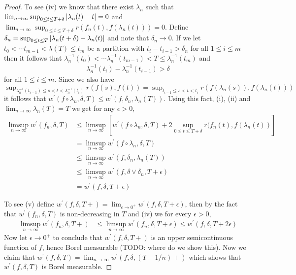 \begin{proof}
To see (iv) we know that there exist $\lambda_n$ such that $\lim_{n \to \infty} \sup_{0 \leq t \leq T+\delta}\left \vert \lambda_n(t) - t \right \vert = 0$ and $\lim_{n \to \infty} \sup_{0 \leq t \leq T+\delta} r(f_n(t), f(\lambda_n(t))) = 0$.  Define $\delta_n = \sup_{0 \leq t \leq T}\left \vert \lambda_n(t+\delta) - \lambda_n(t) \right \vert$ and note that $\delta_n \to 0$.  If we let $t_0 < \dotsb t_{m-1} < \lambda(T) \leq t_m$ be a partition with $t_i - t_{i-1} > \delta_n$ for all $1 \leq i \leq m$ then it follows that $\lambda_n^{-1}(t_0) < \dotsb \lambda_n^{-1}(t_{m-1}) < T \leq \lambda_n^{-1}(t_m)$ and
\begin{align*}
\lambda^{-1}_n(t_i) - \lambda^{-1}_n(t_{i-1}) > \delta
\end{align*}
for all $1 \leq i \leq m$.  Since we also have $\sup_{\lambda^{-1}_n(t_{i-1})  \leq s < t < \lambda^{-1}_n(t_i) } r(f(s), f(t)) = \sup_{t_{i-1}  \leq s < t < t_i} r(f(\lambda_n(s)), f(\lambda_n(t)))$ it follows that $w^\prime(f \circ \lambda_n,\delta, T) \leq w^\prime(f,\delta_n, \lambda_n(T))$.  Using this fact, (i), (ii)  and $\lim_{n \to \infty} \lambda_n(T) = T$ we get for any $\epsilon > 0$,
\begin{align*}
\limsup_{n \to \infty}  w^\prime(f_n,\delta, T) 
&\leq \limsup_{n \to \infty} \left[ w^\prime(f \circ \lambda_n,\delta, T) + 2 \sup_{0 \leq t \leq T+\delta} r(f_n(t), f(\lambda_n(t)) \right] \\
&=\limsup_{n \to \infty}  w^\prime(f \circ \lambda_n,\delta, T) \\
&\leq \limsup_{n \to \infty}  w^\prime(f , \delta_n, \lambda_n(T)) \\
&\leq \limsup_{n \to \infty}  w^\prime(f , \delta \vee \delta_n, T+\epsilon) \\
&=w^\prime(f,\delta, T+\epsilon) 
\end{align*}

To see (v) define $w^\prime(f,\delta, T+) = \lim_{\epsilon \to 0^+} w^\prime(f,\delta, T+\epsilon)$, then by the fact that $w^\prime(f_n,\delta, T)$ is non-decreasing in $T$ and (iv) we for every $\epsilon > 0$,
\begin{align*}
\limsup_{n \to \infty}  w^\prime(f_n,\delta, T+) &\leq \limsup_{n \to \infty}  w^\prime(f_n,\delta, T+\epsilon) \leq w^\prime(f,\delta, T+2\epsilon) 
\end{align*}
Now let $\epsilon \to 0^+$ to conclude that  $w^\prime(f,\delta, T+)$
is an upper semicontinuous function of $f$, hence Borel measurable
(TODO: where do we show this).  Now we claim that 
$w^\prime(f,\delta, T) = \lim_{n \to \infty} w^\prime(f,\delta, (T-1/n)+)$ which shows that $w^\prime(f,\delta, T)$ is Borel measurable.



\end{proof}
